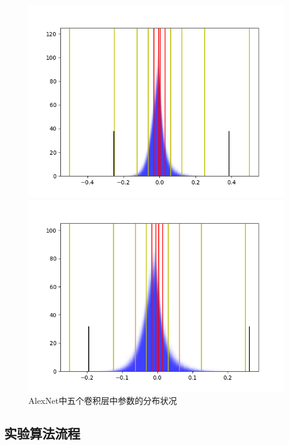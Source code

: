 \documentclass[ pdftex, oneside, master]{NJUthesis}
\begin{document}
\begin{figure}[ht]
\begin{minipage}[t]{0.3\textwidth}
\end{minipage}


\begin{minipage}[t]{0.48\textwidth}
\centering
\includegraphics[width=1\textwidth]{14.png}
\end{minipage}
\begin{minipage}[t]{0.48\textwidth}
\centering
\includegraphics[width=1\textwidth]{15.png}
\end{minipage}
\caption{AlexNet中五个卷积层中参数的分布状况 }
\label{quan_fenbu}
\end{figure}


\subsection{实验算法流程}
\end{document}
